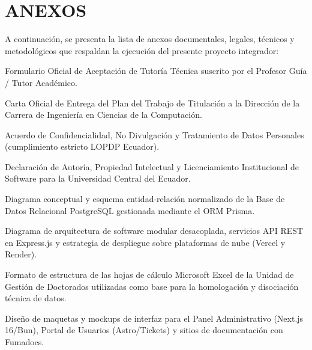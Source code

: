 
\section{ANEXOS}

A continuación, se presenta la lista de anexos documentales, legales, técnicos y metodológicos que respaldan la ejecución del presente proyecto integrador:

\begin{description}[font=\bfseries\color{UceBlue}]
    \item[Anexo A:] Formulario Oficial de Aceptación de Tutoría Técnica suscrito por el Profesor Guía / Tutor Académico.
    \item[Anexo B:] Carta Oficial de Entrega del Plan del Trabajo de Titulación a la Dirección de la Carrera de Ingeniería en Ciencias de la Computación.
    \item[Anexo C:] Acuerdo de Confidencialidad, No Divulgación y Tratamiento de Datos Personales (cumplimiento estricto LOPDP Ecuador).
    \item[Anexo D:] Declaración de Autoría, Propiedad Intelectual y Licenciamiento Institucional de Software para la Universidad Central del Ecuador.
    \item[Anexo E:] Diagrama conceptual y esquema entidad-relación normalizado de la Base de Datos Relacional PostgreSQL gestionada mediante el ORM Prisma.
    \item[Anexo F:] Diagrama de arquitectura de software modular desacoplada, servicios API REST en Express.js y estrategia de despliegue sobre plataformas de nube (Vercel y Render).
    \item[Anexo G:] Formato de estructura de las hojas de cálculo Microsoft Excel de la Unidad de Gestión de Doctorados utilizadas como base para la homologación y disociación técnica de datos.
    \item[Anexo H:] Diseño de maquetas y mockups de interfaz para el Panel Administrativo (Next.js 16/Bun), Portal de Usuarios (Astro/Tickets) y sitios de documentación con Fumadocs.
\end{description}
